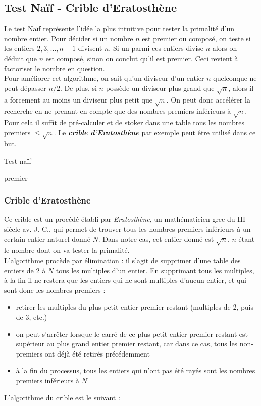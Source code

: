 	\subsection{Test Naïf - Crible d’Eratosthène}
		Le test Naïf représente l'idée la plus intuitive pour tester la primalité d'un nombre entier. Pour décider si un nombre $n$ est premier ou composé, on teste si les entiers $2, 3, ..., n-1$ divisent $n$. Si un parmi ces entiers divise $n$ alors on déduit que $n$ est composé, sinon on conclut qu'il est premier. Ceci revient à factoriser le nombre en question.\\
		\indent Pour améliorer cet algorithme, on sait qu'un diviseur d'un entier $n$ quelconque ne peut dépasser $n/2$. De plus, si $n$ possède un diviseur plus grand que $\sqrt{n}$, alors il a forcement au moins un diviseur plus petit que $\sqrt{n}$. On peut donc accélérer la recherche en ne prenant en compte que des nombres premiers inférieurs à $\sqrt{n}$. Pour cela il suffit de pré-calculer et de stoker dans une table tous les nombres premiers $\leqslant \sqrt{n}$. Le \textbf{\textit{crible d'Eratosthène}} par exemple peut être utilisé dans ce but.\\
	
		\begin{algorithm}[H]
			\caption{Test naïf}\label{TN}
		\Retour premier\;
		\end{algorithm}
		
		\subsubsection*{Crible d'Eratosthène}
		Ce crible est un procédé établi par \textit{Eratosthène}, un mathématicien grec  du III siècle av. J.-C., qui permet de trouver tous les nombres premiers inférieurs à un certain entier naturel donné $N$. Dans notre cas, cet entier donné est $\sqrt{n}$, $n$ étant le nombre dont on va tester la primalité.\\
		\indent L'algorithme procède par élimination : il s'agit de supprimer d'une table des entiers de $2$ à $N$ tous les multiples d'un entier. En supprimant tous les multiples, à la fin il ne restera que les entiers qui ne sont multiples d'aucun entier, et qui sont donc les nombres premiers :
		\begin{itemize}
			\item retirer les multiples du plus petit entier premier restant (multiples de 2, puis de 3, etc.)
			\item on peut s'arrêter lorsque le carré de ce plus petit entier premier restant est supérieur au plus grand entier premier restant, car dans ce cas, tous les non-premiers ont déjà été retirés précédemment
			\item à la fin du processus, tous les entiers qui n'ont pas été rayés sont les nombres premiers inférieurs à $N$
		\end{itemize}
		L'algorithme du crible est le suivant :\\ 
		
